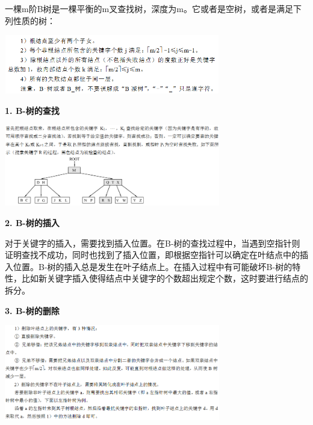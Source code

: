 {一棵m阶B树是一棵平衡的m叉查找树，深度为m。它或者是空树，或者是满足下列性质的树：}

\includegraphics[width=3.70833in,height=1.01042in]{png-jpeg-pics/8B9FFB1654B52E5281DEEC31E5542D98.png}


{\textbf{1. B-树的查找}}

\includegraphics[width=3.70833in,height=1.39583in]{png-jpeg-pics/C68BFA227408F8456869E5A3ECA063AA.png}

{}

{ }

{\textbf{2. B-树的插入}}

{对于关键字的插入，需要找到插入位置。在B-树的查找过程中，当遇到空指针则证明查找不成功，同时也找到了插入位置，即根据空指针可以确定在叶结点中的插入位置。B-树的插入总是发生在叶子结点上。在插入过程中有可能破坏B-树的特性，比如新关键字插入使得结点中关键字的个数超出规定个数，这时要进行结点的拆分。}

{\textbf{3. B-树的删除}}

{\textbf{\includegraphics[width=3.70833in,height=1.64583in]{png-jpeg-pics/61618BE80845AD4A7A536F8ADE89229F.png}}}
